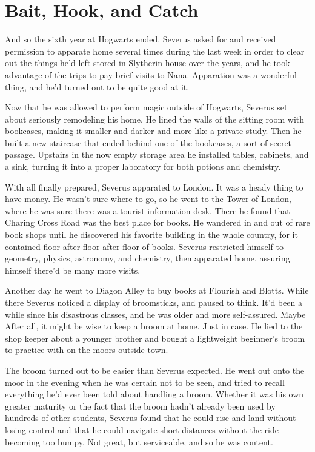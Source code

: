 
\chapter{Bait, Hook, and Catch}


And so the sixth year at Hogwarts ended. Severus asked for and received permission to apparate home several times during the last week in order to clear out the things he'd left stored in Slytherin house over the years, and he took advantage of the trips to pay brief visits to Nana. Apparation was a wonderful thing, and he'd turned out to be quite good at it.

Now that he was allowed to perform magic outside of Hogwarts, Severus set about seriously remodeling his home. He lined the walls of the sitting room with bookcases, making it smaller and darker and more like a private study. Then he built a new staircase that ended behind one of the bookcases, a sort of secret passage. Upstairs in the now empty storage area he installed tables, cabinets, and a sink, turning it into a proper laboratory for both potions and chemistry.

With all finally prepared, Severus apparated to London. It was a heady thing to have money. He wasn't sure where to go, so he went to the Tower of London, where he was sure there was a tourist information desk. There he found that Charing Cross Road was the best place for books. He wandered in and out of rare book shops until he discovered his favorite building in the whole country, for it contained floor after floor after floor of books. Severus restricted himself to geometry, physics, astronomy, and chemistry, then apparated home, assuring himself there'd be many more visits.

Another day he went to Diagon Alley to buy books at Flourish and Blotts. While there Severus noticed a display of broomsticks, and paused to think. It'd been a while since his disastrous classes, and he was older and more self-assured. Maybe{\el} After all, it might be wise to keep a broom at home. Just in case. He lied to the shop keeper about a younger brother and bought a lightweight beginner's broom to practice with on the moors outside town.

The broom turned out to be easier than Severus expected. He went out onto the moor in the evening when he was certain not to be seen, and tried to recall everything he'd ever been told about handling a broom. Whether it was his own greater maturity or the fact that the broom hadn't already been used by hundreds of other students, Severus found that he could rise and land without losing control and that he could navigate short distances without the ride becoming too bumpy. Not great, but serviceable, and so he was content.

